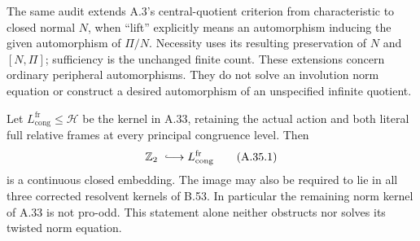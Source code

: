 The same audit extends A.3's central-quotient criterion
from characteristic to closed normal \(N\), when
``lift'' explicitly means an automorphism inducing
the given automorphism of \(\Pi/N\). Necessity
uses its resulting preservation of \(N\) and
\([N,\Pi]\); sufficiency is the unchanged finite
count. These extensions concern ordinary peripheral
automorphisms. They do not solve an involution
norm equation or construct a desired automorphism
of an unspecified infinite quotient.

Let \(L_{\mathrm{cong}}^{\mathrm{fr}}\leq\mathcal H\)
be the kernel in A.33, retaining the actual action and
both literal full relative frames at every principal
congruence level. Then
\[
             \mathbb Z_2\ \lhook\joinrel\longrightarrow
                    L_{\mathrm{cong}}^{\mathrm{fr}}
 \tag{A.35.1}
\]
is a continuous closed embedding. The image may also
be required to lie in all three corrected resolvent
kernels of B.53. In particular the remaining norm
kernel of A.33 is not pro-odd. This statement alone
neither obstructs nor solves its twisted norm equation.

